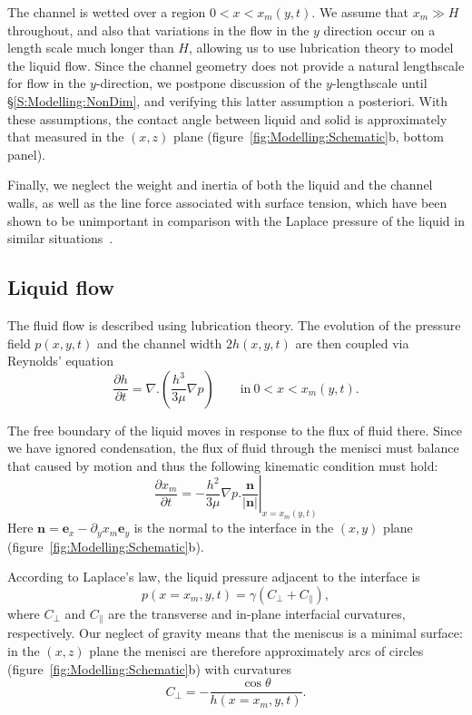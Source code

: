 \documentclass{jfm}
\newcommand{\ddp}[2]{\frac{\partial #1}{\partial #2}}
\begin{document}
The channel is wetted over a region $0 < x < x_m(y,t)$. We assume that $x_m \gg H$ throughout, and also that variations in the flow in the $y$ direction occur on a length scale much longer than $H$, allowing us to use lubrication theory to model the liquid flow. Since the channel geometry does not provide a natural lengthscale for flow in the $y$-direction, we postpone discussion of the $y$-lengthscale until \S\ref{S:Modelling:NonDim}, and verifying this latter assumption a posteriori. With these assumptions, the contact angle between liquid and solid is approximately that measured in the $(x,z)$ plane (figure~\ref{fig:Modelling:Schematic}b, bottom panel).

Finally, we neglect the weight and inertia of both the liquid and the channel walls, as well as the line force associated with surface tension, which have been shown to be unimportant in comparison with the Laplace pressure of the liquid in similar situations~\citep{Taroni2012JFM, Bradley2019PRL, BradleyPhDthesis}.

\subsection{Liquid flow}
The fluid flow is described using lubrication theory. The evolution of the pressure field $p(x,y,t)$ and the channel width $2h(x,y,t)$ are then coupled via Reynolds' equation
\begin{equation}\label{E:Model:Liquid:Reynolds}
\ddp{h}{t} = \nabla.\left( \frac{h^3}{3\mu} \nabla p\right) \qquad \text{in}~0 < x < x_m(y,t).
\end{equation}

The free boundary of the liquid moves in response to the flux of fluid there. Since we have ignored condensation, the flux of fluid through the menisci must balance that caused by motion and thus the following kinematic condition must hold:
\begin{equation}\label{E:Model:Liquid:Kinematic}
\ddp{x_m}{t} = -\left.\frac{h^2}{3\mu}\nabla p .\frac{\mathbf{n}}{|\mathbf{n}|}\right|_{x = x_m(y,t)}
\end{equation}
Here $\mathbf{n} = \mathbf{e}_x -\partial_y x_m  \mathbf{e}_y$ is the normal to the interface in the $(x,y)$ plane (figure~\ref{fig:Modelling:Schematic}b).

According to Laplace's law, the liquid pressure adjacent to the interface is
\begin{equation}\label{E:Model:Liquid:LaplaceBC}
 p(x = x_m, y,t) = \gamma\left(C_{\perp} + C_{\parallel}\right),
\end{equation}
where $C_{\perp}$ and $C_{\parallel}$ are the transverse and in-plane interfacial curvatures, respectively. Our neglect of gravity means that the meniscus is a minimal surface: in the $(x,z)$ plane the menisci are therefore approximately arcs of circles (figure~\ref{fig:Modelling:Schematic}b) with curvatures
\begin{equation}\label{E:Model:Liquid:CPerp}
C_{\perp} = -\frac{\cos \theta}{h(x=x_m,y,t)}.
\end{equation}
\end{document}
